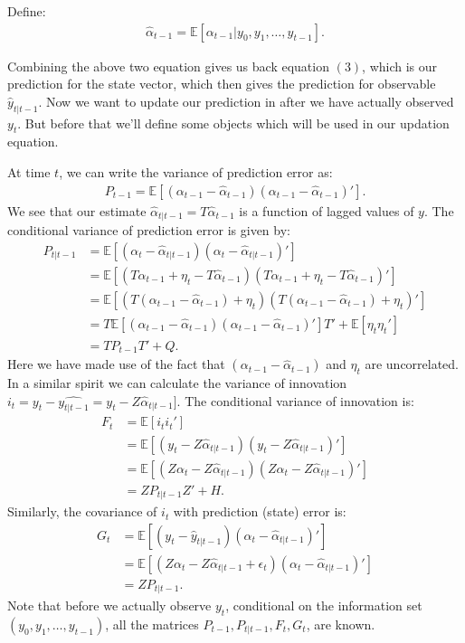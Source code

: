 \documentclass[12pt]{article}
\begin{document}
Define:
\begin{align*}
\hat{\alpha}_{t-1} = \mathbb{E}[\alpha_{t-1}| y_0, y_1, \dots , y_{t-1}].
\end{align*}

Combining the above two equation gives us back equation $(3)$, which is our prediction  for the state vector, which then gives the prediction for observable $\hat{y}_{t|t-1}$. Now we want to update our prediction in after we have actually observed $y_t$. But before that we'll define some objects which will be used in our updation equation.

At time $t$, we can write the variance of prediction error as:
\begin{align*}
P_{t-1} = \mathbb{E}[(\alpha_{t-1} - \hat{\alpha}_{t-1})(\alpha_{t-1} - \hat{\alpha}_{t-1})'].
\end{align*}
We see that our estimate $\hat{\alpha}_{t|t-1} = T \hat{\alpha}_{t-1}$ is a function of lagged values of $y$. The conditional variance of prediction error is given by:
\begin{align*}
P_{t|t-1} &  = \mathbb{E}[(\alpha_t - \hat{\alpha}_{t|t-1})(\alpha_t - \hat{\alpha}_{t|t-1})']\\
& = \mathbb{E}[(T\alpha_{t-1} + \eta_t - T\hat{\alpha}_{t-1})(T\alpha_{t-1} + \eta_t - T\hat{\alpha}_{t-1})']\\
& = \mathbb{E}[(T(\alpha_{t-1}-\hat{\alpha}_{t-1})+ \eta_t)(T(\alpha_{t-1}-\hat{\alpha}_{t-1})+ \eta_t)'] \\
& = T\mathbb{E}[(\alpha_{t-1}-\hat{\alpha}_{t-1})(\alpha_{t-1}-\hat{\alpha}_{t-1})']T'+ \mathbb{E}[\eta_t\eta_t']\\
& = TP_{t-1}T' + Q.
\end{align*}
Here we have made use of the fact that $(\alpha_{t-1}-\hat{\alpha}_{t-1})$ and $\eta_t$ are uncorrelated. In a similar spirit we can calculate the variance of innovation $i_t = y_t - \hat{y_{t|t-1}} = y_t - Z \hat{\alpha}_{t|t-1}].$ The conditional variance of innovation is: 
\begin{align*}
F_t & = \mathbb{E}[i_t i_t'] \\
 & = \mathbb{E}[(y_t - Z \hat{\alpha}_{t|t-1})(y_t - Z \hat{\alpha}_{t|t-1})']\\
& = \mathbb{E}[(Z \alpha_t - Z \hat{\alpha}_{t|t-1})( Z \alpha_t - Z \hat{\alpha}_{t|t-1})']\\
& = Z P_{t|t-1}Z' + H.
\end{align*}
Similarly, the covariance of $i_t$ with prediction (state) error is:
\begin{align*}
G_t & = \mathbb{E}[(y_t - \hat{y}_{t|t-1})(\alpha_t - \hat{\alpha}_{t|t-1})']\\
& = \mathbb{E}[(Z\alpha_t - Z\hat{\alpha}_{t|t-1} + \epsilon_t)(\alpha_t - \hat{\alpha}_{t|t-1})'] \\
& = ZP_{t|t-1}.
\end{align*}
Note that before we actually observe $y_t$, conditional on the information set $(y_0, y_1, \dots, y_{t-1})$, all the matrices $P_{t-1}, P_{t|t-1}, F_t, G_t$, are known.
\end{document}
